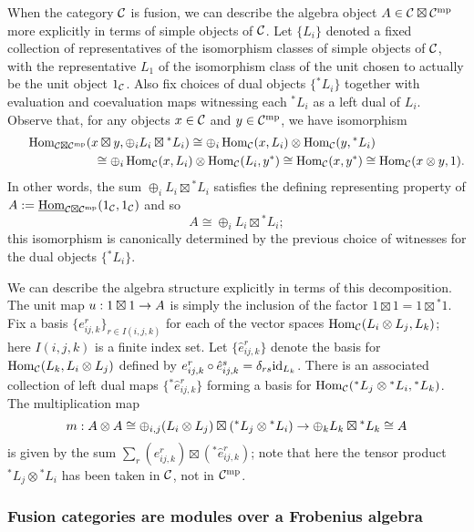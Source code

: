 \documentclass{amsart}
\begin{document}
When the category $\mathcal C$ is fusion, we can describe the algebra object $A \in \mathcal C \boxtimes \mathcal C^{\mathrm{mp}}$ more explicitly in terms of simple objects of $\mathcal C$.  Let $\{L_i\}$ denoted a fixed collection of representatives of the isomorphism classes of simple objects of $\mathcal C$, with the representative $L_1$ of the isomorphism class of the unit chosen to actually be the unit object $1_\mathcal C$.  Also fix choices of dual objects $\{{}^* L_i\}$ together with evaluation and coevaluation maps witnessing each ${}^* L_i$ as a left dual of $L_i$.  Observe that, for any objects $x \in \mathcal C$ and $y \in \mathcal C^{\mathrm{mp}}$, we have isomorphism
\[
\begin{split}
\operatorname{Hom}_{\mathcal C \boxtimes \mathcal C^{\mathrm{mp}}}( x \boxtimes y , \oplus_i L_i \boxtimes {}^* L_i)
\cong
\oplus_i \operatorname{Hom}_{\mathcal C}(x, L_i) \otimes \operatorname{Hom}_{\mathcal C}(y, {}^*L_i) \hspace*{1in}\\\hspace*{1in}
\cong
\oplus_i \operatorname{Hom}_{\mathcal C}(x, L_i) \otimes \operatorname{Hom}_{\mathcal C}(L_i, y^*)
\cong
\operatorname{Hom}_{\mathcal C}(x, y^*)
\cong
\operatorname{Hom}_{\mathcal C}(x \otimes y, 1).
\end{split}
\]
In other words, the sum $\oplus_i L_i \boxtimes {}^* L_i$ satisfies the defining representing property of $A := \operatorname{\underline{Hom}}_{\mathcal C \boxtimes \mathcal C^{\mathrm{mp}}}(1_\mathcal C,1_\mathcal C)$ and so
\[
A \cong \oplus_i L_i \boxtimes {}^* L_i;
\]
this isomorphism is canonically determined by the previous choice of witnesses for the dual objects $\{{}^* L_i\}$.

We can describe the algebra structure explicitly in terms of this decomposition.  The unit map $u: 1 \boxtimes 1 \rightarrow A$ is simply the inclusion of the factor $1 \boxtimes 1 = 1 \boxtimes {}^*1$.  Fix a basis $\{e^r_{ij,k}\}_{r \in I(i,j,k)}$ for each of the vector spaces $\operatorname{Hom}_\mathcal C(L_i \otimes L_j,L_k)$; here $I(i,j,k)$ is a finite index set.  Let $\{\hat{e}^r_{ij,k}\}$ denote the basis for $\operatorname{Hom}_\mathcal C(L_k,L_i \otimes L_j)$ defined by $e^r_{ij,k} \circ \hat{e}^s_{ij,k} = \delta_{rs} \mathrm{id}_{L_k}$.  There is an associated collection of left dual maps $\{{}^*\hat{e}^r_{ij,k}\}$ forming a basis for $\operatorname{Hom}_\mathcal C({}^* L_j \otimes {}^* L_i, {}^* L_k)$.  The multiplication map
\[
m: A \otimes A \cong \oplus_{i,j} (L_i \otimes L_j) \boxtimes ({}^* L_j \otimes {}^* L_i) \rightarrow \oplus_k L_k \boxtimes {}^* L_k \cong A
\]
is given by the sum $\sum_r (e^r_{ij,k}) \boxtimes ({}^*\hat{e}^r_{ij,k})$; note that here the tensor product ${}^* L_j \otimes {}^* L_i$ has been taken in $\mathcal C$, not in $\mathcal C^{\mathrm{mp}}$.

\subsubsection{Fusion categories are modules over a Frobenius algebra}
\end{document}
